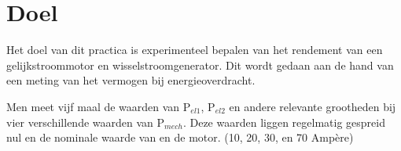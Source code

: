 \section{Doel}
Het doel van dit practica is experimenteel bepalen van het rendement van een gelijkstroommotor en wisselstroomgenerator. Dit wordt gedaan aan de hand van een meting van het vermogen bij energieoverdracht.

Men meet vijf maal de waarden van P$_{el1}$, P$_{el2}$ en andere relevante grootheden bij vier verschillende waarden van P$_{mech}$. Deze waarden liggen regelmatig gespreid nul en de nominale waarde van en de motor. (10, 20, 30, en 70 Ampère)
